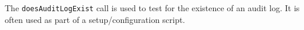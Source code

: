 The \verb+doesAuditLogExist+ call is used to test for the existence of an audit log. It is often used
as part of a setup/configuration script.
